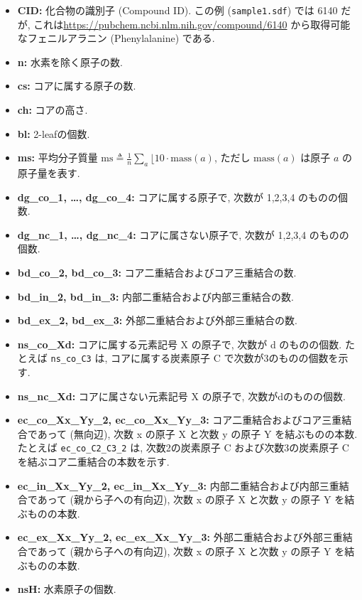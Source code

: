 \documentclass[11pt,titlepage,dvipdfmx,twoside]{jsbook}
\begin{document}
\begin{itemize}
\item {\bf CID:} 化合物の識別子 (Compound ID).
  この例 ({\tt sample1.sdf}) では 6140 だが, これは\url{https://pubchem.ncbi.nlm.nih.gov/compound/6140} から取得可能なフェニルアラニン (Phenylalanine) である.
\item {\bf n:} 水素を除く原子の数.
\item {\bf cs:} コアに属する原子の数.
\item {\bf ch:} コアの高さ.
\item {\bf bl:} 2-leafの個数.
\item {\bf ms:} 平均分子質量 $\textrm{ms}\triangleq\frac{1}{n}\sum_{a}\lfloor 10 \cdot \textrm{mass}(a)$, ただし $\textrm{mass}(a)$ は原子 $a$ の原子量を表す.
\item {\bf dg\_co\_1, \dots, dg\_co\_4:} コアに属する原子で, 次数が 1,2,3,4 のものの個数.
\item {\bf dg\_nc\_1, \dots, dg\_nc\_4:} コアに属さない原子で, 次数が 1,2,3,4 のものの個数. 
\item {\bf bd\_co\_2, bd\_co\_3:} コア二重結合およびコア三重結合の数.
\item {\bf bd\_in\_2, bd\_in\_3:} 内部二重結合および内部三重結合の数.
\item {\bf bd\_ex\_2, bd\_ex\_3:} 外部二重結合および外部三重結合の数.
\item {\bf ns\_co\_Xd:} コアに属する元素記号 X の原子で,
  次数が d のものの個数.
  たとえば {\tt ns\_co\_C3} は, コアに属する炭素原子 C で次数が3のものの個数を示す.
\item {\bf ns\_nc\_Xd:} コアに属さない元素記号 X の原子で, 次数がdのものの個数.
\item {\bf ec\_co\_Xx\_Yy\_2, ec\_co\_Xx\_Yy\_3:}
  コア二重結合およびコア三重結合であって (無向辺),
  次数 x の原子 X と次数 y の原子 Y を結ぶものの本数.
  たとえば {\tt ec\_co\_C2\_C3\_2} は,
  次数2の炭素原子 C および次数3の炭素原子 C を結ぶコア二重結合の本数を示す.
\item {\bf ec\_in\_Xx\_Yy\_2, ec\_in\_Xx\_Yy\_3:}
  内部二重結合および内部三重結合であって (親から子への有向辺),
  次数 x の原子 X と次数 y の原子 Y を結ぶものの本数.
\item {\bf ec\_ex\_Xx\_Yy\_2, ec\_ex\_Xx\_Yy\_3:}
  外部二重結合および外部三重結合であって (親から子への有向辺),
  次数 x の原子 X と次数 y の原子 Y を結ぶものの本数.
\item {\bf nsH:} 水素原子の個数.
\end{itemize}
\end{document}
